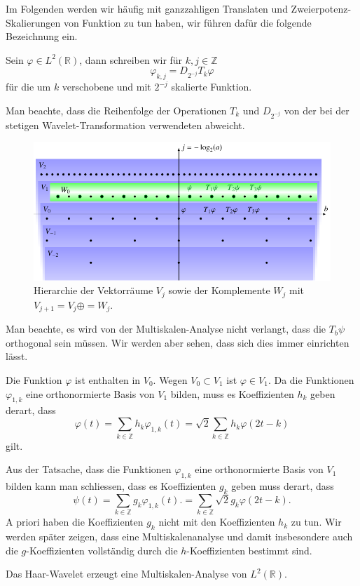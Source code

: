 Im Folgenden werden wir häufig mit ganzzahligen Translaten und
Zweierpotenz-Skalierungen von Funktion zu tun haben, wir führen dafür
die folgende Bezeichnung ein.

\begin{definition}
Sein $\varphi\in L^2(\mathbb R)$, dann schreiben wir für $k,j\in \mathbb Z$
\[
\varphi_{k,j} = D_{2^{-j}}T_k\varphi
\]
für die um $k$ verschobene und mit $2^{-j}$ skalierte Funktion.
\end{definition}

Man beachte, dass die Reihenfolge der Operationen $T_k$ und $D_{2^{-j}}$
von der bei der stetigen Wavelet-Transformation verwendeten abweicht.

\begin{figure}
\centering
\includegraphics{chapters/6-msa/images/msa.pdf}
\caption{Hierarchie der Vektorräume $V_j$ sowie der Komplemente $W_j$
mit
$V_{j+1} = V_j \oplus = W_j$.
\label{msa:vektorraumhierarchie}}
\end{figure}

Man beachte, es wird von der Multiskalen-Analyse nicht verlangt, dass 
die $T_b\psi$ orthogonal sein müssen.
Wir werden aber sehen, dass sich dies immer einrichten lässt.

Die Funktion $\varphi$ ist enthalten in $V_0$.
Wegen $V_0\subset V_1$ ist $\varphi\in V_1$.
Da die Funktionen $\varphi_{1,k}$ eine orthonormierte Basis von $V_1$
bilden, muss es Koeffizienten $h_k$ geben derart, dass
\begin{equation}
\varphi(t) = \sum_{k\in\mathbb Z} h_k\varphi_{1,k}(t)
=
\sqrt{2}\sum_{k\in\mathbb Z}h_k\varphi(2t-k)
\label{msa:skalrel-h}
\end{equation}
gilt.

Aus der Tatsache, dass die Funktionen $\varphi_{1,k}$ eine orthonormierte
Basis von $V_1$ bilden kann man schliessen, dass es Koeffizienten $g_k$
geben muss derart, dass
\begin{equation}
\psi(t)
=
\sum_{k\in\mathbb Z} g_k\varphi_{1,k}(t).
=
\sum_{k\in\mathbb Z}\sqrt{2}g_k \varphi(2t-k).
\label{msa:skalrel-g}
\end{equation}
A priori haben die Koeffizienten $g_k$ nicht mit den Koeffizienten $h_k$
zu tun.
Wir werden später zeigen, dass eine Multiskalenanalyse und damit
insbesondere auch die $g$-Koeffizienten vollständig durch
die $h$-Koeffizienten bestimmt sind.

\begin{beispiel}
Das Haar-Wavelet erzeugt eine Multiskalen-Analyse von $L^2(\mathbb R)$.
\end{beispiel}

